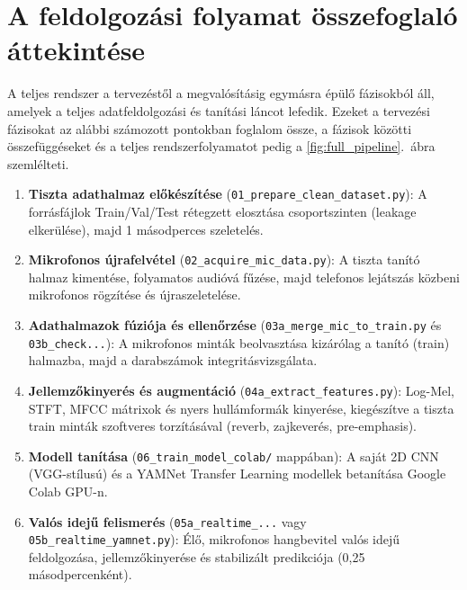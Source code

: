 \section{A feldolgozási folyamat összefoglaló áttekintése}
\label{sec:pipeline_overview}

A teljes rendszer a tervezéstől a megvalósításig egymásra épülő fázisokból áll, amelyek a teljes adatfeldolgozási és tanítási láncot lefedik. Ezeket a tervezési fázisokat az alábbi számozott pontokban foglalom össze, a fázisok közötti összefüggéseket és a teljes rendszerfolyamatot pedig a \ref{fig:full_pipeline}.~ábra szemlélteti.

\begin{enumerate}
  \item \textbf{Tiszta adathalmaz előkészítése} (\texttt{01\_prepare\_clean\_dataset.py}): A forrásfájlok Train/Val/Test rétegzett elosztása csoportszinten (leakage elkerülése), majd 1 másodperces szeletelés.
  \item \textbf{Mikrofonos újrafelvétel} (\texttt{02\_acquire\_mic\_data.py}): A tiszta tanító halmaz kimentése, folyamatos audióvá fűzése, majd telefonos lejátszás közbeni mikrofonos rögzítése és újraszeletelése.
  \item \textbf{Adathalmazok fúziója és ellenőrzése} (\texttt{03a\_merge\_mic\_to\_train.py} és \texttt{03b\_check...}): A mikrofonos minták beolvasztása kizárólag a tanító (train) halmazba, majd a darabszámok integritásvizsgálata.
  \item \textbf{Jellemzőkinyerés és augmentáció} (\texttt{04a\_extract\_features.py}): Log-Mel, STFT, MFCC mátrixok és nyers hullámformák kinyerése, kiegészítve a tiszta train minták szoftveres torzításával (reverb, zajkeverés, pre-emphasis).
  \item \textbf{Modell tanítása} (\texttt{06\_train\_model\_colab/} mappában): A saját 2D CNN (VGG-stílusú) és a YAMNet Transfer Learning modellek betanítása Google Colab GPU-n.
  \item \textbf{Valós idejű felismerés} (\texttt{05a\_realtime\_...} vagy \texttt{05b\_realtime\_yamnet.py}): Élő, mikrofonos hangbevitel valós idejű feldolgozása, jellemzőkinyerése és stabilizált predikciója (0,25 másodpercenként).
\end{enumerate}

